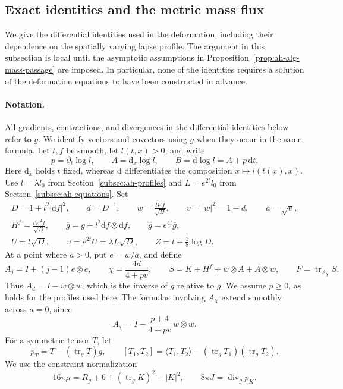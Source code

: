 \subsection{Exact identities and the metric mass flux}
\label{sec:ah-algebra}

We give the differential identities used in the deformation, including
their dependence on the spatially varying lapse profile.  The argument
in this subsection is local until the asymptotic assumptions in
Proposition~\ref{prop:ah-alg-mass-passage} are imposed.  In particular,
none of the identities requires a solution of the deformation equations
to have been constructed in advance.

\paragraph{Notation.}
All gradients, contractions, and divergences in the differential
identities below refer to \(g\).  We identify vectors and covectors using
\(g\) when they occur in the same formula.  Let \(t,f\) be smooth,
let \(l(t,x)>0\), and write
\[
 p=\partial_t\log l,\qquad
 A=\mathrm d_x\log l,\qquad
 B=\mathrm d\log l=A+p\,\mathrm dt.
\]
Here \(\mathrm d_x\) holds \(t\) fixed, whereas \(\mathrm d\) differentiates
the composition \(x\mapsto l(t(x),x)\). Use \(l=\lambda l_0\)
from Section~\ref{subsec:ah-profiles} and \(L=e^{2t}l_0\)
from Section~\ref{subsec:ah-equations}. Set
\begin{gather*}
 D=1+l^2|\mathrm df|^2,\qquad d=D^{-1},\qquad
 w=\frac{l\nabla f}{\sqrt D},\qquad v=|w|^2=1-d,\qquad a=\sqrt v,\\
 H^f=\frac{l\nabla^2 f}{\sqrt D},\qquad
 \overline g=g+l^2\mathrm df\otimes\mathrm df,\qquad
 \widehat g=e^{4t}\overline g,\\
 U=l\sqrt D,\qquad u=e^{2t}U=\lambda L\sqrt D,\qquad
 Z=t+\frac18\log D .
\end{gather*}
At a point where \(a>0\), put \(e=w/a\), and define
\[
 A_j=I+(j-1)e\otimes e,\qquad
 \chi=\frac{4d}{4+pv},\qquad
 S=K+H^f+w\otimes A+A\otimes w,\qquad
 F=\operatorname{tr}_{A_\chi}S.
\]
Thus \(A_d=I-w\otimes w\), which is the inverse of \(\overline g\)
relative to \(g\).  We assume \(p\ge0\), as holds for the profiles used
here.  The formulas involving \(A_\chi\) extend smoothly across
\(a=0\), since
\[
 A_\chi=I-\frac{p+4}{4+pv}\,w\otimes w.
\]
For a symmetric tensor \(T\), let
\[
 p_T=T-(\operatorname{tr}_gT)g,\qquad
 [T_1,T_2]=\langle T_1,T_2\rangle
          -(\operatorname{tr}_gT_1)(\operatorname{tr}_gT_2).
\]
We use the constraint normalization
\[
 16\pi\mu=R_g+6+(\operatorname{tr}_gK)^2-|K|^2,\qquad
 8\pi J=\operatorname{div}_g p_K.
\]


